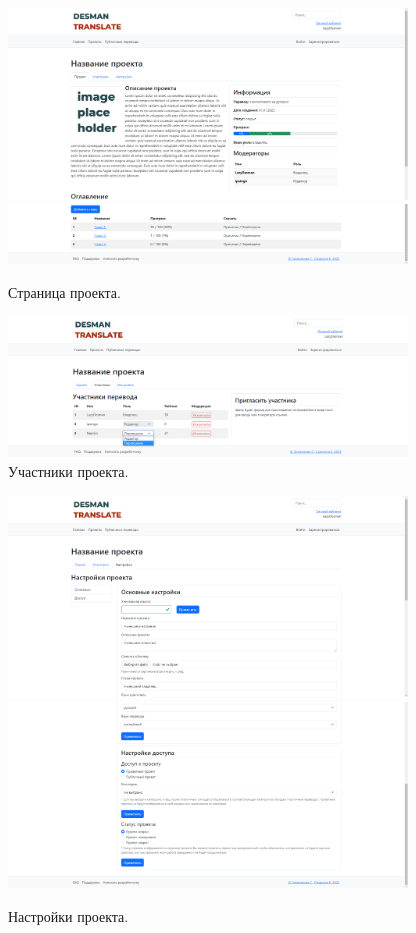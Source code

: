 \documentclass[a4paper,12pt]{article}
\begin{document}
\begin{figure}[h]
\centering
\includegraphics[width=400px]{projectpage1.png}
\includegraphics[width=400px]{projectpage2.png}
\caption{Страница проекта.}
\label{fig:projectpage}
\end{figure}

\begin{figure}[h]
\centering
\includegraphics[width=400px]{members.png}
\caption{Участники проекта.}
\label{fig:members}
\end{figure}

\begin{figure}[h]
\centering
\includegraphics[width=400px]{settings1.png}
\includegraphics[width=400px]{settings2.png}
\caption{Настройки проекта.}
\label{fig:settings}
\end{figure}
\end{document}
